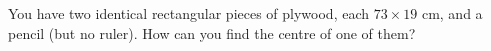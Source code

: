You have two identical rectangular pieces of plywood, each $73\times19$ cm, and a pencil (but no ruler). How can you find the centre of one of them?

